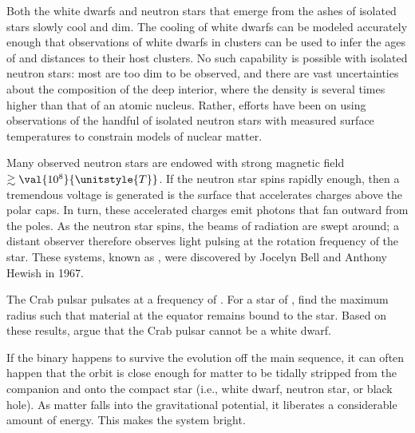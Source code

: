 Both the white dwarfs and neutron stars that emerge from the ashes of isolated stars slowly cool and dim. The cooling of white dwarfs can be modeled accurately enough that observations of white dwarfs in clusters can be used to infer the ages of and distances to their host clusters. No such capability is possible with isolated neutron stars: most are too dim to be observed, and there are vast uncertainties about the composition of the deep interior, where the density is several times higher than that of an atomic nucleus. Rather, efforts have been on using observations of the handful of isolated neutron stars with measured surface temperatures to constrain models of nuclear matter.

Many observed neutron stars are endowed with strong magnetic field $\gtrsim\val{10^{8}}{\unitstyle{T}}$. If the neutron star spins rapidly enough, then a tremendous voltage is generated is the surface that accelerates charges above the polar caps. In turn, these accelerated charges emit photons that fan outward from the poles. As the neutron star spins, the beams of radiation are swept around; a distant observer therefore observes light pulsing at the rotation frequency of the star. These systems, known as , were discovered\cite{Hewish1968Observation-of-} by Jocelyn Bell and Anthony Hewish in 1967.

\begin{exercisebox}
The Crab pulsar pulsates at a frequency of . For a star of , find the maximum radius such that material at the equator remains bound to the star. Based on these results, argue that the Crab pulsar cannot be a white dwarf.
\end{exercisebox}

 If the binary happens to survive the evolution off the main sequence, it can often happen that the orbit is close enough for matter to be tidally stripped from the companion and  onto the compact star (i.e., white dwarf, neutron star, or black hole). As matter falls into the gravitational potential, it liberates a considerable amount of energy. This makes the system bright.

